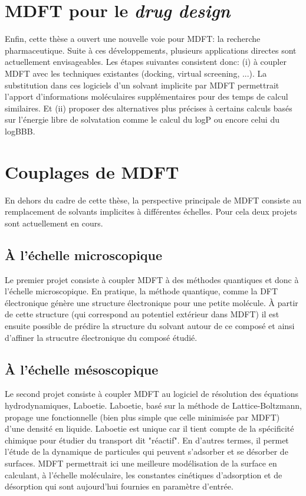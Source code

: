 \section{MDFT pour le \textit{drug design}}
Enfin, cette thèse a ouvert une nouvelle voie pour MDFT: la recherche pharmaceutique. Suite à ces développements, plusieurs applications directes sont actuellement envisageables. Les étapes suivantes consistent donc: (i) à coupler MDFT avec les techniques existantes (docking, virtual screening, ...). La substitution dans ces logiciels d'un solvant implicite par MDFT permettrait l'apport d'informations moléculaires supplémentaires pour des temps de calcul similaires. Et (ii) proposer des alternatives plus précises à certains calculs basés sur l'énergie libre de solvatation comme le calcul du logP ou encore celui du logBBB.

\section{Couplages de MDFT}
En dehors du cadre de cette thèse, la perspective principale de MDFT consiste au remplacement de solvants implicites à différentes échelles. Pour cela deux projets sont actuellement en cours.
\subsection{\`A l'échelle microscopique}
Le premier projet consiste à coupler MDFT à des méthodes quantiques et donc à l'échelle microscopique. En pratique, la méthode quantique, comme la DFT électronique génère une structure électronique pour une petite molécule. À partir de cette structure (qui correspond au potentiel extérieur dans MDFT) il est ensuite possible de prédire la structure du solvant autour de ce composé et ainsi d'affiner la strucutre électronique du composé étudié.


\subsection{\`A l'échelle mésoscopique}
Le second projet consiste à coupler MDFT au logiciel de résolution des équations hydrodynamiques, Laboetie\cite{Levesque_accounting_2013,Vanson_unexpected_2015,Asta_transient_2017}. Laboetie, basé sur la méthode de Lattice-Boltzmann, propage une fonctionnelle (bien plus simple que celle minimisée par MDFT) d'une densité en liquide. Laboetie est unique car il tient compte de la spécificité chimique pour étudier du transport dit "réactif". En d'autres termes, il permet l'étude de la dynamique de particules qui peuvent s'adsorber et se désorber de surfaces.
MDFT permettrait ici une meilleure modélisation de la surface en calculant, à l'échelle moléculaire, les constantes cinétiques d'adsorption et de désorption qui sont aujourd'hui fournies en paramètre d'entrée.




